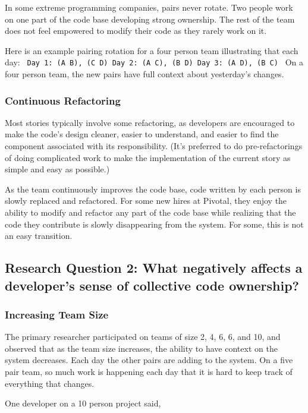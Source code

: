 In some extreme programming companies, pairs never rotate. Two people work on one part of the code base developing strong ownership. The rest of the team does not feel empowered to modify their code as they rarely work on it. 

Here is an example pairing rotation for a four person team illustrating that each day: \texttt{
Day 1: (A B), (C D)
Day 2: (A C), (B D)
Day 3: (A D), (B C)
} On a four person team,  the new pairs have full context about yesterday's changes.

\subsubsection{Continuous Refactoring}
Most stories typically involve some refactoring, as developers are encouraged to make the code's design cleaner, easier to understand, and easier to find the component associated with its responsibility. (It's preferred to do pre-refactorings of doing complicated work to make the implementation of the current story as simple and easy as possible.) 

 As the team continuously improves the code base, code written by each person is slowly replaced and refactored. For some new hires at Pivotal, they enjoy the ability to modify and refactor any part of the code base while realizing that the code they contribute is slowly disappearing from the system. For some, this is not an easy transition.
\subsection{Research Question 2: What negatively affects a developer's sense of collective code ownership?}
\subsubsection{Increasing Team Size}

The primary researcher participated on teams of size 2, 4, 6, 6, and 10, and observed that as the team size increases, the ability to have context on the system decreases. Each day the other pairs are adding to the system. On a five pair team, so much work is happening each day that it is hard to keep track of everything that changes.

One developer on a 10 person project said, 

